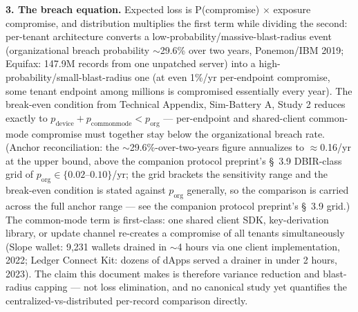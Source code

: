 \documentclass[
]{article}
\begin{document}
\textbf{3. The breach equation.} Expected loss is P(compromise)
\(\times\) exposure \textbar{} compromise, and distribution multiplies
the first term while dividing the second: per-tenant architecture
converts a low-probability/massive-blast-radius event (organizational
breach probability \(\sim\)29.6\% over two years, Ponemon/IBM 2019;
Equifax: 147.9M records from one unpatched server) into a
high-probability/small-blast-radius one (at even 1\%/yr per-endpoint
compromise, some tenant endpoint among millions is compromised
essentially every year). The break-even condition from Technical
Appendix, Sim-Battery A, Study 2 reduces exactly to
\textbf{\(p_{\mathrm{device}} + p_{\mathrm{commonmode}} < p_{\mathrm{org}}\)}
--- per-endpoint and shared-client common-mode compromise must together
stay below the organizational breach rate. (Anchor reconciliation: the
\(\sim\)29.6\%-over-two-years figure annualizes to \(\approx\)0.16/yr at
the upper bound, above the companion protocol preprint's §~3.9
DBIR-class grid of \(p_{\mathrm{org}} \in \{0.02\text{--}0.10\}\)/yr;
the grid brackets the sensitivity range and the break-even condition is
stated against \(p_{\mathrm{org}}\) generally, so the comparison is
carried across the full anchor range --- see the companion protocol
preprint's §~3.9 grid.) The common-mode term is first-class: one shared
client SDK, key-derivation library, or update channel re-creates a
compromise of all tenants simultaneously (Slope wallet: 9,231 wallets
drained in \(\sim\)4 hours via one client implementation, 2022; Ledger
Connect Kit: dozens of dApps served a drainer in under 2 hours, 2023).
The claim this document makes is therefore variance reduction and
blast-radius capping --- not loss elimination, and no canonical study
yet quantifies the centralized-vs-distributed per-record comparison
directly.
\end{document}
